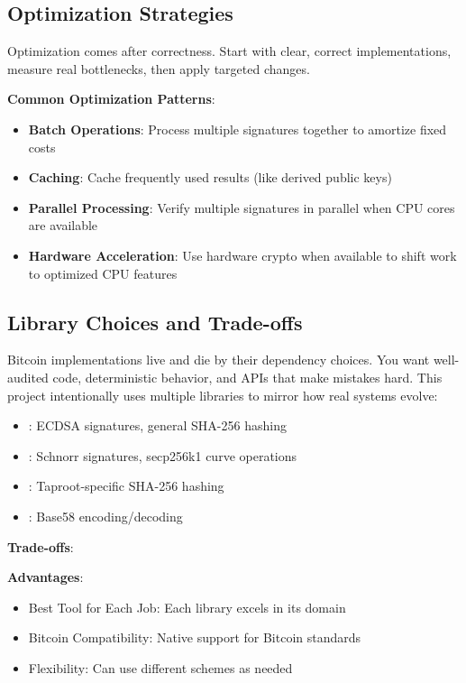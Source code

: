 \subsection{Optimization Strategies}
\label{sec:ch08-optimization}

Optimization comes after correctness. Start with clear, correct implementations, measure real bottlenecks, then apply targeted changes.

\textbf{Common Optimization Patterns}:
\begin{itemize}
  \item \textbf{Batch Operations}: Process multiple signatures together to amortize fixed costs
  \item \textbf{Caching}: Cache frequently used results (like derived public keys)
  \item \textbf{Parallel Processing}: Verify multiple signatures in parallel when CPU cores are available
  \item \textbf{Hardware Acceleration}: Use hardware crypto when available to shift work to optimized CPU features
\end{itemize}

\subsection{Library Choices and Trade-offs}
\label{sec:ch08-library-choices}

Bitcoin implementations live and die by their dependency choices. You want well-audited code, deterministic behavior, and APIs that make mistakes hard. This project intentionally uses multiple libraries to mirror how real systems evolve:

\begin{itemize}
  \item \textbf{}: ECDSA signatures, general SHA-256 hashing
  \item \textbf{}: Schnorr signatures, secp256k1 curve operations
  \item \textbf{}: Taproot-specific SHA-256 hashing
  \item \textbf{}: Base58 encoding/decoding
\end{itemize}

\textbf{Trade-offs}:

\noindent
\textbf{Advantages}:
\begin{itemize}
  \item Best Tool for Each Job: Each library excels in its domain
  \item Bitcoin Compatibility: Native support for Bitcoin standards
  \item Flexibility: Can use different schemes as needed
\end{itemize}


